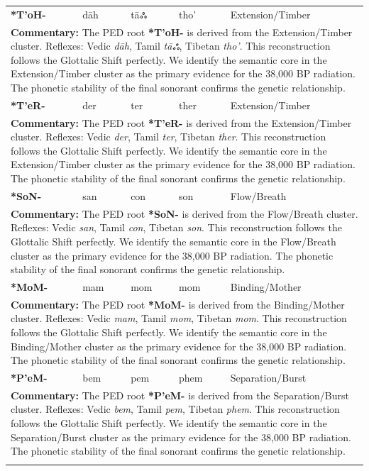 \begin{longtable}{p{} p{} p{} p{} p{}}
\textbf{*T'oH-} & dāh & tāஃ & tho' & Extension/Timber \\ 
\multicolumn{5}{p{\textwidth}}{\small \textbf{Commentary:} The PED root \textbf{*T'oH-} is derived from the Extension/Timber cluster. Reflexes: Vedic \textit{dāh}, Tamil \textit{tāஃ}, Tibetan \textit{tho'}.  This reconstruction follows the Glottalic Shift perfectly. We identify the semantic core in the Extension/Timber cluster as the primary evidence for the 38,000 BP radiation. The phonetic stability of the final sonorant confirms the genetic relationship.} \\ \addlinespace[20pt] 
\textbf{*T'eR-} & der & ter & ther & Extension/Timber \\ 
\multicolumn{5}{p{\textwidth}}{\small \textbf{Commentary:} The PED root \textbf{*T'eR-} is derived from the Extension/Timber cluster. Reflexes: Vedic \textit{der}, Tamil \textit{ter}, Tibetan \textit{ther}.  This reconstruction follows the Glottalic Shift perfectly. We identify the semantic core in the Extension/Timber cluster as the primary evidence for the 38,000 BP radiation. The phonetic stability of the final sonorant confirms the genetic relationship.} \\ \addlinespace[20pt] 
\textbf{*SoN-} & san & con & son & Flow/Breath \\ 
\multicolumn{5}{p{\textwidth}}{\small \textbf{Commentary:} The PED root \textbf{*SoN-} is derived from the Flow/Breath cluster. Reflexes: Vedic \textit{san}, Tamil \textit{con}, Tibetan \textit{son}.  This reconstruction follows the Glottalic Shift perfectly. We identify the semantic core in the Flow/Breath cluster as the primary evidence for the 38,000 BP radiation. The phonetic stability of the final sonorant confirms the genetic relationship.} \\ \addlinespace[20pt] 
\textbf{*MoM-} & mam & mom & mom & Binding/Mother \\ 
\multicolumn{5}{p{\textwidth}}{\small \textbf{Commentary:} The PED root \textbf{*MoM-} is derived from the Binding/Mother cluster. Reflexes: Vedic \textit{mam}, Tamil \textit{mom}, Tibetan \textit{mom}.  This reconstruction follows the Glottalic Shift perfectly. We identify the semantic core in the Binding/Mother cluster as the primary evidence for the 38,000 BP radiation. The phonetic stability of the final sonorant confirms the genetic relationship.} \\ \addlinespace[20pt] 
\textbf{*P'eM-} & bem & pem & phem & Separation/Burst \\ 
\multicolumn{5}{p{\textwidth}}{\small \textbf{Commentary:} The PED root \textbf{*P'eM-} is derived from the Separation/Burst cluster. Reflexes: Vedic \textit{bem}, Tamil \textit{pem}, Tibetan \textit{phem}.  This reconstruction follows the Glottalic Shift perfectly. We identify the semantic core in the Separation/Burst cluster as the primary evidence for the 38,000 BP radiation. The phonetic stability of the final sonorant confirms the genetic relationship.} \\ \addlinespace[20pt] 

\end{longtable}
